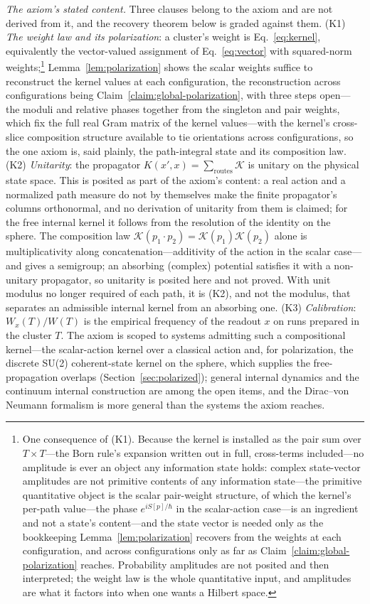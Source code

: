 \emph{The axiom's stated content.} Three clauses belong to the axiom and are not derived from it, and the recovery theorem below is graded against them. (K1) \emph{The weight law and its polarization}: a cluster's weight is Eq.~\eqref{eq:kernel}, equivalently the vector-valued assignment of Eq.~\eqref{eq:vector} with squared-norm weights;\footnote{One consequence of (K1). Because the kernel is installed as the pair sum over $T \times T$---the Born rule's expansion written out in full, cross-terms included---no amplitude is ever an object any information state holds: complex state-vector amplitudes are not primitive contents of any information state---the primitive quantitative object is the scalar pair-weight structure, of which the kernel's per-path value---the phase $e^{iS[p]/\hbar}$ in the scalar-action case---is an ingredient and not a state's content---and the state vector is needed only as the bookkeeping Lemma~\ref{lem:polarization} recovers from the weights at each configuration, and across configurations only as far as Claim~\ref{claim:global-polarization} reaches. Probability amplitudes are not posited and then interpreted; the weight law is the whole quantitative input, and amplitudes are what it factors into when one wants a Hilbert space.} Lemma~\ref{lem:polarization} shows the scalar weights suffice to reconstruct the kernel values at each configuration, the reconstruction across configurations being Claim~\ref{claim:global-polarization}, with three steps open---the moduli and relative phases together from the singleton and pair weights, which fix the full real Gram matrix of the kernel values---with the kernel's cross-slice composition structure available to tie orientations across configurations, so the one axiom is, said plainly, the path-integral state and its composition law. (K2) \emph{Unitarity}: the propagator $K(x',x) = \sum_{\text{routes}}\mathcal{K}$ is unitary on the physical state space. This is posited as part of the axiom's content: a real action and a normalized path measure do not by themselves make the finite propagator's columns orthonormal, and no derivation of unitarity from them is claimed; for the free internal kernel it follows from the resolution of the identity on the sphere. The composition law $\mathcal{K}(p_1 \cdot p_2) = \mathcal{K}(p_1)\mathcal{K}(p_2)$ alone is multiplicativity along concatenation---additivity of the action in the scalar case---and gives a semigroup; an absorbing (complex) potential satisfies it with a non-unitary propagator, so unitarity is posited here and not proved. With unit modulus no longer required of each path, it is (K2), and not the modulus, that separates an admissible internal kernel from an absorbing one. (K3) \emph{Calibration}: $W_x(T)/W(T)$ is the empirical frequency of the readout $x$ on runs prepared in the cluster $T$. The axiom is scoped to systems admitting such a compositional kernel---the scalar-action kernel over a classical action and, for polarization, the discrete SU(2) coherent-state kernel on the sphere, which supplies the free-propagation overlaps (Section~\ref{sec:polarized}); general internal dynamics and the continuum internal construction are among the open items, and the Dirac--von Neumann formalism is more general than the systems the axiom reaches.

